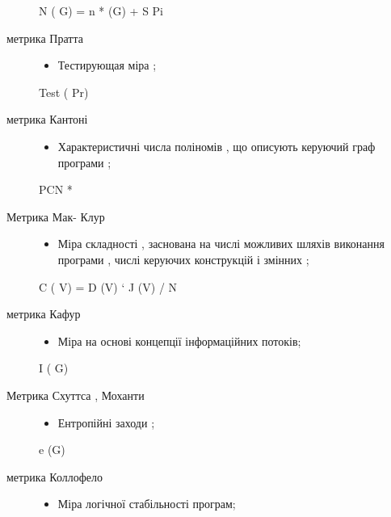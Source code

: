 \documentclass[oneside,final,14pt]{extreport}
\begin{document}
\begin{description}
\begin{itemize}
\end{itemize}

N ( G) = n * (G) + S Pi

\item[{метрика Пратта}] \leavevmode\begin{itemize}
\item {} 
Тестирующая міра ;

\end{itemize}

Test ( Pr)

\item[{метрика Кантоні}] \leavevmode\begin{itemize}
\item {} 
Характеристичні числа поліномів , що описують керуючий граф програми ;

\end{itemize}

PCN *

\item[{Метрика Мак- Клур}] \leavevmode\begin{itemize}
\item {} 
Міра складності , заснована на числі можливих шляхів виконання програми , числі керуючих конструкцій і змінних ;

\end{itemize}

C ( V) = D (V) ` J (V) / N

\item[{метрика Кафур}] \leavevmode\begin{itemize}
\item {} 
Міра на основі концепції інформаційних потоків;

\end{itemize}

I ( G)

\item[{Метрика Схуттса , Моханти}] \leavevmode\begin{itemize}
\item {} 
Ентропійні заходи ;

\end{itemize}

e (G)

\item[{метрика Коллофело}] \leavevmode\begin{itemize}
\item {} 
Міра логічної стабільності програм;

\end{itemize}


\end{description}
\end{document}
